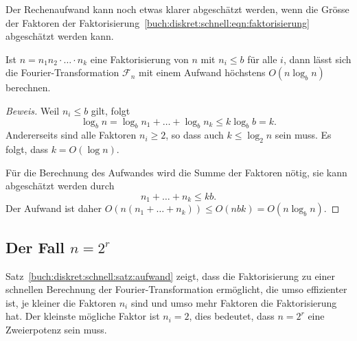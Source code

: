 Der Rechenaufwand kann noch etwas klarer abgeschätzt werden, wenn 
die Grösse der Faktoren der 
Faktorisierung~\eqref{buch:diskret:schnell:eqn:faktorisierung}
abgeschätzt werden kann.

\begin{satz}
\label{buch:diskret:schnell:satz:aufwand}
Ist $n=n_1n_2\cdot\ldots\cdot n_k$ eine Faktorisierung von $n$
mit $n_i\le b$ für alle $i$, dann lässt sich die Fourier-Transformation
$\mathscr{F}_n$ mit einem Aufwand höchstens $O(n\log_b n)$ berechnen.
\end{satz}

\begin{proof}[Beweis]
Weil $n_i\le b$ gilt, folgt
\[
\log_b n=\log_bn_1+ \ldots +\log_b n_k
\le 
k\log_b b
=
k.
\]
Andererseits sind alle Faktoren $n_i\ge 2$, so dass auch $k\le \log_2 n$
sein muss.
Es folgt, dass $k=O(\log n)$.

Für die Berechnung des Aufwandes wird die Summe der Faktoren nötig,
sie kann abgeschätzt werden durch
\[
n_1+\ldots+n_k
\le
kb.
\]
Der Aufwand ist daher
\(
O(n(n_1+\ldots+n_k))
\le
O(nbk)
=
O(n\log_b n)
\).
\end{proof}

%
%
\subsection{Der Fall $n=2^r$
\label{buch:diskret:schnell:subsection:n=2r}}
Satz~\ref{buch:diskret:schnell:satz:aufwand} zeigt, dass 
die Faktorisierung zu einer schnellen Berechnung der Fourier-Transformation
ermöglicht, die umso effizienter ist, je kleiner die Faktoren $n_i$
sind und umso mehr Faktoren die Faktorisierung hat.
Der kleinste mögliche Faktor ist $n_i=2$, dies bedeutet, dass $n=2^r$
eine Zweierpotenz sein muss.

